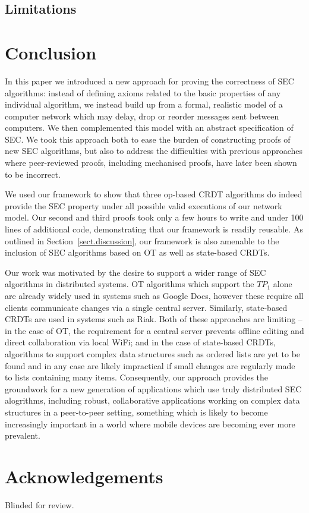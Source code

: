 \documentclass[acmlarge,review,anonymous]{acmart}\settopmatter{printfolios=true}
\begin{document}
\subsection{Limitations}
\label{sect.limitations}

\section{Conclusion}
\label{sect.conclusion}

In this paper we introduced a new approach for proving the correctness of SEC algorithms: instead of defining axioms related to the basic properties of any individual algorithm, we instead build up from a formal, realistic model of a computer network which may delay, drop or reorder messages sent between computers. We then complemented this model with an abstract specification of SEC. We took this approach both to ease the burden of constructing proofs of new SEC algorithms, but also to address the difficulties with previous approaches where peer-reviewed proofs, including mechanised proofs, have later been shown to be incorrect.

We used our framework to show that three op-based CRDT algorithms do indeed provide the SEC property under all possible valid executions of our network model. Our second and third proofs took only a few hours to write and under 100 lines of additional code, demonstrating that our framework is readily reusable. As outlined in Section~\ref{sect.discussion}, our framework is also amenable to the inclusion of SEC algorithms based on OT as well as state-based CRDTs.

Our work was motivated by the desire to support a wider range of SEC algorithms in distributed systems. OT algorithms which support the $\mathit{TP}_1$ alone are already widely used in systems such as Google Docs, however these require all clients communicate changes via a single central server. Similarly, state-based CRDTs are used in systems such as Riak. Both of these approaches are limiting -- in the case of OT, the requirement for a central server prevents offline editing and direct collaboration via local WiFi; and in the case of state-based CRDTs, algorithms to support complex data structures such as ordered lists are yet to be found and in any case are likely impractical if small changes are regularly made to lists containing many items. Consequently, our approach provides the groundwork for a new generation of applications which use truly distributed SEC alogrithms, including robust, collaborative applications working on complex data structures in a peer-to-peer setting, something which is likely to become increasingly important in a world where mobile devices are becoming ever more prevalent.

\section*{Acknowledgements}

Blinded for review.


{}


\end{document}
